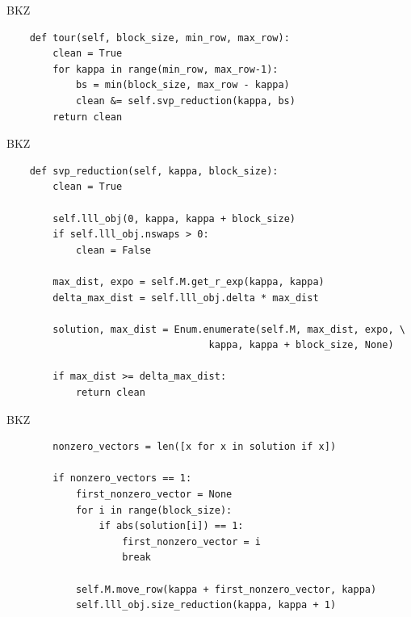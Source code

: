 \documentclass[presentation,smaller]{beamer}
\begin{document}
\begin{frame}[fragile,label={sec:orgheadline19}]{BKZ}
 \lstset{language=Python,label= ,caption= ,captionpos=b,numbers=none}
\begin{lstlisting}
    def tour(self, block_size, min_row, max_row):
        clean = True
        for kappa in range(min_row, max_row-1):
            bs = min(block_size, max_row - kappa)
            clean &= self.svp_reduction(kappa, bs)
        return clean
\end{lstlisting}
\end{frame}

\begin{frame}[fragile,label={sec:orgheadline20}]{BKZ}
 \lstset{language=Python,label= ,caption= ,captionpos=b,numbers=none}
\begin{lstlisting}
    def svp_reduction(self, kappa, block_size):
        clean = True

        self.lll_obj(0, kappa, kappa + block_size)
        if self.lll_obj.nswaps > 0:
            clean = False

        max_dist, expo = self.M.get_r_exp(kappa, kappa)
        delta_max_dist = self.lll_obj.delta * max_dist

        solution, max_dist = Enum.enumerate(self.M, max_dist, expo, \
                                   kappa, kappa + block_size, None)

        if max_dist >= delta_max_dist:
            return clean
\end{lstlisting}
\end{frame}

\begin{frame}[fragile,label={sec:orgheadline21}]{BKZ}
 \lstset{language=Python,label= ,caption= ,captionpos=b,numbers=none}
\begin{lstlisting}
        nonzero_vectors = len([x for x in solution if x])

        if nonzero_vectors == 1:
            first_nonzero_vector = None
            for i in range(block_size):
                if abs(solution[i]) == 1:
                    first_nonzero_vector = i
                    break

            self.M.move_row(kappa + first_nonzero_vector, kappa)
            self.lll_obj.size_reduction(kappa, kappa + 1)
\end{lstlisting}
\end{frame}
\end{document}
